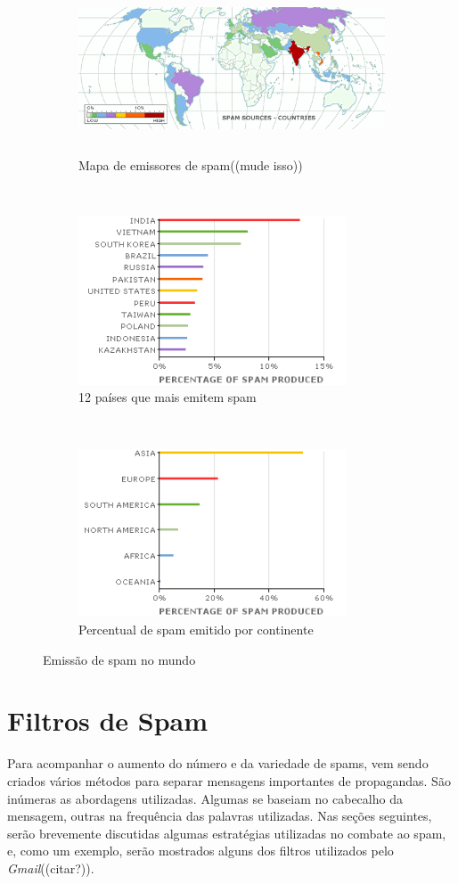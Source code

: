 \documentclass[a4paper,dvipdfm]{article}
\begin{document}
	\begin{figure}[ht]
		\begin{subfigure}[b]{\textwidth}
			\centering
			\includegraphics[height=5cm]{Imagens/m86security/spam-country-map.png}
			\caption{Mapa de emissores de spam((mude isso))}
		\end{subfigure}
		~
		\begin{subfigure}[b]{0.47\textwidth}
			\centering
			\includegraphics[height=5cm]{Imagens/m86security/spam-country-bar.png}
			\caption{12 países que mais emitem spam}
		\end{subfigure}
		~
		\begin{subfigure}[b]{0.47\textwidth}
			\centering
			\includegraphics[height=5cm]{Imagens/m86security/spam-continent-bar.png}
			\caption{Percentual de spam emitido por continente}
		\end{subfigure}
		\caption{Emissão de spam no mundo}
		\label{fig:spamworld}
	\end{figure}

\newpage
\section{Filtros de Spam}
	Para acompanhar o aumento do número e da variedade de spams, vem sendo criados vários métodos para separar mensagens importantes de propagandas.
	São inúmeras as abordagens utilizadas. 
	Algumas se baseiam no \gls{cabecalho} da mensagem, outras na frequência das palavras utilizadas.
	Nas seções seguintes, serão brevemente discutidas algumas estratégias utilizadas no combate ao spam, e, como um exemplo, serão mostrados alguns dos filtros utilizados pelo \emph{Gmail}((citar?)).
\end{document}
